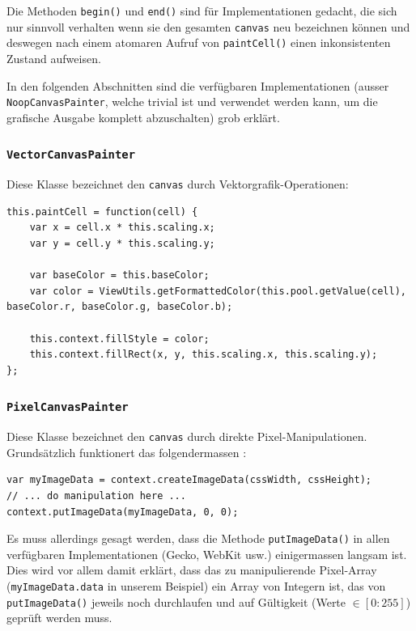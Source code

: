 \documentclass[11pt]{report} %
\theoremstyle{definition}
\begin{document}
Die Methoden {\tt begin()} und {\tt end()} sind für Implementationen gedacht, die sich nur sinnvoll verhalten wenn sie den gesamten {\tt canvas} neu bezeichnen können und deswegen nach einem atomaren Aufruf von {\tt paintCell()} einen inkonsistenten Zustand aufweisen.

In den folgenden Abschnitten sind die verfügbaren Implementationen (ausser {\tt NoopCanvasPainter}, welche trivial ist und verwendet werden kann, um die grafische Ausgabe komplett abzuschalten) grob erklärt. 

\subsubsection{{\tt VectorCanvasPainter}}

Diese Klasse bezeichnet den {\tt canvas} durch Vektorgrafik-Operationen:

\begin{lstlisting}
this.paintCell = function(cell) {
	var x = cell.x * this.scaling.x;
	var y = cell.y * this.scaling.y;
	
	var baseColor = this.baseColor;
	var color = ViewUtils.getFormattedColor(this.pool.getValue(cell), baseColor.r, baseColor.g, baseColor.b);
	
	this.context.fillStyle = color;
	this.context.fillRect(x, y, this.scaling.x, this.scaling.y);
};
\end{lstlisting}

\subsubsection{{\tt PixelCanvasPainter}}

Diese Klasse bezeichnet den {\tt canvas} durch direkte Pixel-Manipulationen. Grundsätzlich funktionert das folgendermassen \cite{mdn:PixelCanvasDoku}:

\begin{lstlisting}
var myImageData = context.createImageData(cssWidth, cssHeight);
// ... do manipulation here ...
context.putImageData(myImageData, 0, 0);
\end{lstlisting}

Es muss allerdings gesagt werden, dass die Methode {\tt putImageData()} in allen verfügbaren Implementationen (Gecko, WebKit usw.) einigermassen langsam ist. Dies wird vor allem damit erklärt, dass das zu manipulierende Pixel-Array ({\tt myImageData.data} in unserem Beispiel) ein Array von Integern ist, das von {\tt putImageData()} jeweils noch durchlaufen und auf Gültigkeit (Werte $\in [0: 255]$) geprüft werden muss.
\end{document}
